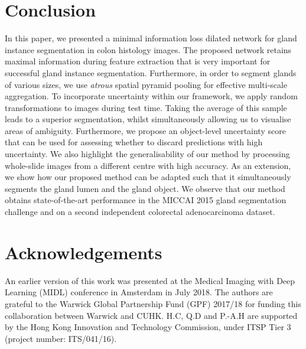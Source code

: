 \documentclass[3p]{elsarticle}
\begin{document}
\section{Conclusion}
In this paper, we presented a minimal information loss dilated network for gland instance segmentation in colon histology images. The proposed network retains maximal information during feature extraction that is very important for successful gland instance segmentation. Furthermore, in order to segment glands of various sizes, we use \textit{atrous} spatial pyramid pooling for effective multi-scale aggregation. To incorporate uncertainty within our framework, we apply random transformations to images during test time. Taking the average of this sample leads to a superior segmentation, whilst simultaneously allowing us to visualise areas of ambiguity. Furthermore, we propose an object-level uncertainty score that can be used for assessing whether to discard predictions with high uncertainty. We also highlight the generalisability of our method by processing whole-slide images from a different centre with high accuracy. As an extension, we show how our proposed method can be adapted such that it simultaneously segments the gland lumen and the gland object. 
We observe that our method obtains state-of-the-art performance in the MICCAI 2015 gland segmentation challenge and on a second independent colorectal adenocarcinoma dataset.  

\vspace{-0.5em}

\section{Acknowledgements}
An earlier version of this work was presented at the Medical Imaging with Deep Learning (MIDL) conference in Amsterdam in July 2018. The authors are grateful to the Warwick Global Partnership Fund (GPF) 2017/18 for funding this collaboration between Warwick and CUHK. H.C, Q.D and P.-A.H are supported by the Hong Kong Innovation and Technology Commission, under ITSP Tier 3 (project number: ITS/041/16).

\vspace{-0.5em}



\end{document}
